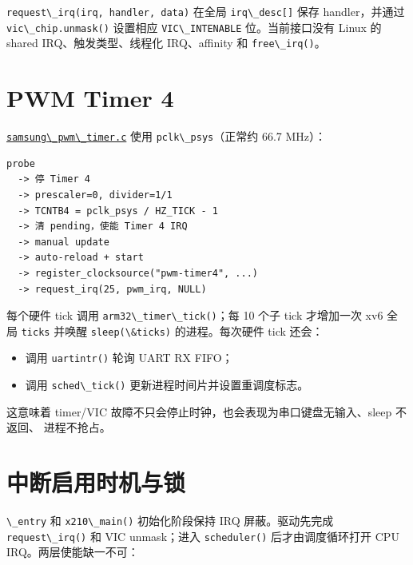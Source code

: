 \passthrough{\lstinline!request\_irq(irq, handler, data)!} 在全局
\passthrough{\lstinline!irq\_desc[]!} 保存 handler，并通过
\passthrough{\lstinline!vic\_chip.unmask()!} 设置相应
\passthrough{\lstinline!VIC\_INTENABLE!} 位。当前接口没有 Linux 的
shared IRQ、触发类型、线程化 IRQ、affinity 和
\passthrough{\lstinline!free\_irq()!}。

\section{PWM Timer 4}\label{pwm-timer-4}

\href{../../../kernel/drivers/clocksource/samsung_pwm_timer.c}{\passthrough{\lstinline!samsung\_pwm\_timer.c!}}
使用 \passthrough{\lstinline!pclk\_psys!}（正常约 66.7 MHz）：

\begin{lstlisting}
probe
  -> 停 Timer 4
  -> prescaler=0, divider=1/1
  -> TCNTB4 = pclk_psys / HZ_TICK - 1
  -> 清 pending，使能 Timer 4 IRQ
  -> manual update
  -> auto-reload + start
  -> register_clocksource("pwm-timer4", ...)
  -> request_irq(25, pwm_irq, NULL)
\end{lstlisting}

每个硬件 tick 调用 \passthrough{\lstinline!arm32\_timer\_tick()!}；每 10
个子 tick 才增加一次 xv6 全局 \passthrough{\lstinline!ticks!} 并唤醒
\passthrough{\lstinline!sleep(\&ticks)!} 的进程。每次硬件 tick 还会：

\begin{itemize}
\tightlist
\item
  调用 \passthrough{\lstinline!uartintr()!} 轮询 UART RX FIFO；
\item
  调用 \passthrough{\lstinline!sched\_tick()!}
  更新进程时间片并设置重调度标志。
\end{itemize}

这意味着 timer/VIC 故障不只会停止时钟，也会表现为串口键盘无输入、sleep
不返回、 进程不抢占。

\section{中断启用时机与锁}\label{ux4e2dux65adux542fux7528ux65f6ux673aux4e0eux9501}

\passthrough{\lstinline!\_entry!} 和
\passthrough{\lstinline!x210\_main()!} 初始化阶段保持 IRQ
屏蔽。驱动先完成 \passthrough{\lstinline!request\_irq()!} 和 VIC
unmask；进入 \passthrough{\lstinline!scheduler()!} 后才由调度循环打开
CPU IRQ。两层使能缺一不可：

